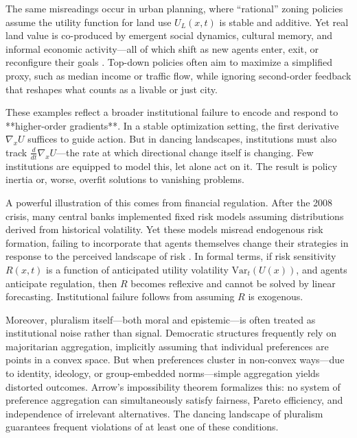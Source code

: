 \documentclass[12pt]{article}  %
\begin{document}
The same misreadings occur in urban planning, where “rational” zoning policies assume the utility function for land use \( U_L(x, t) \) is stable and additive. Yet real land value is co-produced by emergent social dynamics, cultural memory, and informal economic activity—all of which shift as new agents enter, exit, or reconfigure their goals \parencite{jacobs1961death, ostrom1990governing}. Top-down policies often aim to maximize a simplified proxy, such as median income or traffic flow, while ignoring second-order feedback that reshapes what counts as a livable or just city.

These examples reflect a broader institutional failure to encode and respond to **higher-order gradients**. In a stable optimization setting, the first derivative \( \nabla_x U \) suffices to guide action. But in dancing landscapes, institutions must also track \( \frac{d}{dt} \nabla_x U \)—the rate at which directional change itself is changing. Few institutions are equipped to model this, let alone act on it. The result is policy inertia or, worse, overfit solutions to vanishing problems.

A powerful illustration of this comes from financial regulation. After the 2008 crisis, many central banks implemented fixed risk models assuming distributions derived from historical volatility. Yet these models misread endogenous risk formation, failing to incorporate that agents themselves change their strategies in response to the perceived landscape of risk \parencite{haldane2012dog}. In formal terms, if risk sensitivity \( R(x, t) \) is a function of anticipated utility volatility \( \text{Var}_t(U(x)) \), and agents anticipate regulation, then \( R \) becomes reflexive and cannot be solved by linear forecasting. Institutional failure follows from assuming \( R \) is exogenous.

Moreover, pluralism itself—both moral and epistemic—is often treated as institutional noise rather than signal. Democratic structures frequently rely on majoritarian aggregation, implicitly assuming that individual preferences are points in a convex space. But when preferences cluster in non-convex ways—due to identity, ideology, or group-embedded norms—simple aggregation yields distorted outcomes. Arrow’s impossibility theorem \parencite{arrow1950difficulty} formalizes this: no system of preference aggregation can simultaneously satisfy fairness, Pareto efficiency, and independence of irrelevant alternatives. The dancing landscape of pluralism guarantees frequent violations of at least one of these conditions.
\end{document}
